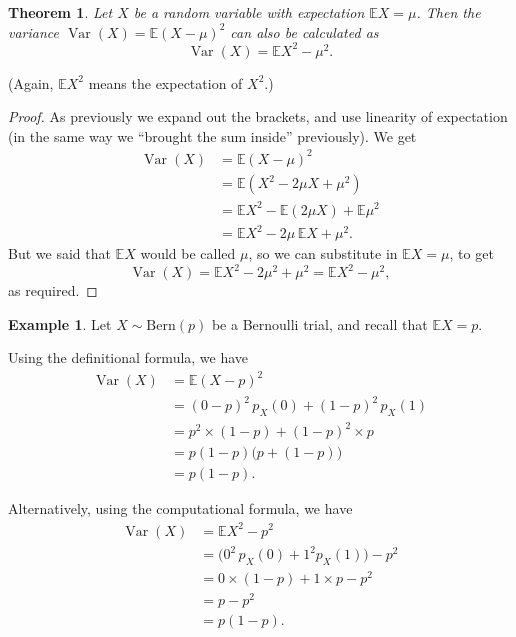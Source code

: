 \documentclass[
  a4paper,
]{book}
\newtheorem{theorem}{Theorem}[chapter]
\theoremstyle{definition}
\theoremstyle{definition}
\newtheorem{example}{Example}[chapter]
\theoremstyle{definition}
\theoremstyle{definition}
\theoremstyle{remark}
\begin{document}
\begin{theorem}
Let \(X\) be a random variable with expectation \(\mathbb EX = \mu\). Then the variance \(\operatorname{Var}(X) = \mathbb E(X - \mu)^2\) can also be calculated as
\[ \operatorname{Var}(X) = \mathbb EX^2 - \mu^2 . \]
\end{theorem}

(Again, \(\mathbb EX^2\) means the expectation of \(X^2\).)

\begin{proof}
As previously we expand out the brackets, and use linearity of expectation (in the same way we ``brought the sum inside'' previously). We get
\begin{align*}
  \operatorname{Var}(X) &= \mathbb E(X - \mu)^2 \\
    &= \mathbb E(X^2 - 2\mu X + \mu^2) \\
    &= \mathbb EX^2 - \mathbb E(2\mu X) + \mathbb E \mu^2 \\
    &= \mathbb EX^2 - 2\mu \,\mathbb EX + \mu^2 .
\end{align*}
But we said that \(\mathbb EX\) would be called \(\mu\), so we can substitute in \(\mathbb EX = \mu\), to get
\[ \operatorname{Var}(X) = \mathbb E X^2 - 2\mu^2 + \mu^2 = \mathbb E X^2 - \mu^2 , \]
as required.
\end{proof}

\begin{example}
Let \(X \sim \text{Bern}(p)\) be a Bernoulli trial, and recall that \(\mathbb EX = p\).

Using the definitional formula, we have
\begin{align*}
\operatorname{Var}(X) &= \mathbb E(X-p)^2 \\
        &= (0 - p)^2 \,p_X(0) + (1-p)^2\, p_X(1) \\
        &= p^2\times(1-p) + (1-p)^2 \times p \\
        &= p(1-p)\big(p + (1-p)\big) \\
        &= p(1-p) .
\end{align*}

Alternatively, using the computational formula, we have
\begin{align*}
\operatorname{Var}(X) &= \mathbb EX^2 - p^2 \\
        &= \big(0^2\,p_X(0) + 1^2 p_X(1)\big) - p^2 \\
        &= 0\times(1-p) + 1\times p - p^2 \\
        &= p - p^2 \\
        &= p(1-p) .
\end{align*}
\end{example}
\end{document}
